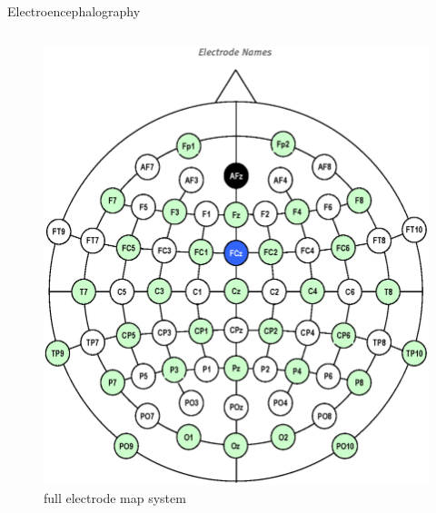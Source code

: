 \documentclass[xcolor=dvipsnames]{beamer} %
\begin{document}
    \begin{frame}{Electroencephalography}
        \begin{columns}
        \begin{column}{0.5\textwidth}
            \begin{figure}
                \centering
                \includegraphics[scale=0.13]{images/EEG_electrodes_map_full.png}
                \caption{full electrode map system}
                \label{fig:full}
            \end{figure}
        \end{column}
        

\end{columns}
\end{frame}
\end{document}
